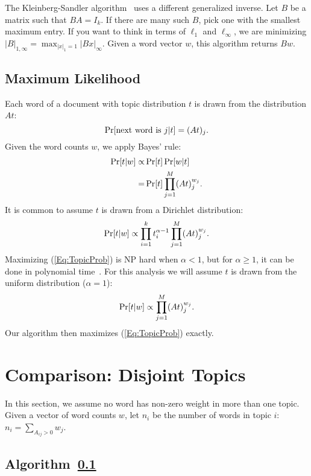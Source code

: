 \documentclass{article}
\begin{document}
The Kleinberg-Sandler algorithm~\cite{kleinberg2004using} uses a different generalized inverse.
Let \(B\) be a matrix such that \(BA = I_k\).
If there are many such \(B\), pick one with the smallest maximum entry.
If you want to think in terms of \(\ell_1\) and \(\ell_\infty\), we are minimizing \(|B|_{1,\infty} = \max_{|x|_1 = 1} |B x|_\infty\).
Given a word vector \(w\), this algorithm returns \(Bw\).

\subsection{Maximum Likelihood}
\label{Sec:MLAlg}

Each word of a document with topic distribution \(t\) is drawn from the distribution \(A t\):
\[ \Pr[\text{next word is \(j\)} | t] = (A t)_j \ldotp \]
Given the word counts \(w\), we apply Bayes' rule:
\begin{align*}
    \Pr[t | w] \propto & \Pr[t] \Pr[w | t]
\\  = & \Pr[t] \prod_{j=1}^M (A t)_j^{w_j} \ldotp
\end{align*}
It is common to assume \(t\) is drawn from a Dirichlet distribution:
\begin{equation}
    \label{Eq:TopicProbWithAlpha}
    \Pr[t | w] \propto \prod_{i = 1}^k t_i^{\alpha - 1} \prod_{j=1}^M (A t)_j^{w_j} \ldotp
\end{equation}
Maximizing (\ref{Eq:TopicProb}) is NP hard when \(\alpha < 1\), but for \(\alpha \ge 1\), it can be done in polynomial time~\cite{conf/nips/SontagR11}.
For this analysis we will assume \(t\) is drawn from the uniform distribution (\(\alpha=1\)):
\begin{equation}
    \label{Eq:TopicProb}
    \Pr[t | w] \propto \prod_{j=1}^M (A t)_j^{w_j} \ldotp
\end{equation}
Our algorithm then maximizes (\ref{Eq:TopicProb}) exactly.

\section{Comparison: Disjoint Topics}

In this section, we assume no word has non-zero weight in more than one topic.
Given a vector of word counts \(w\), let \(n_i\) be the number of words in topic \(i\): \(n_i = \sum_{A_{ij} > 0} w_j\).

\subsection{Algorithm~\ref{Sec:MLAlg}}
\end{document}
